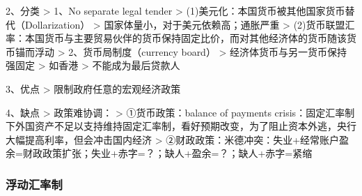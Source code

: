 \documentclass[12pt]{book}
\begin{document}
2、分类
> 1、No separate legal tender  
> (1)美元化：本国货币被其他国家货币替代（Dollarization）  
> 国家体量小，对于美元依赖高；通胀严重  
> (2)货币联盟汇率：本国货币与主要贸易伙伴的货币保持固定比价，而对其他经济体的货币随该货币锚而浮动  
> 2、货币局制度（currency board）  
> 经济体货币与另一货币保持强固定  
> 如香港  
> 不能成为最后贷款人


3、优点
> 限制政府任意的宏观经济政策

4、缺点
> 政策难协调：  
> ①货币政策：balance of payments crisis：固定汇率制下外国资产不足以支持维持固定汇率制，看好预期改变，为了阻止资本外逃，央行大幅提高利率，但会冲击国内经济  
> ②财政政策：米德冲突：失业+经常账户盈余=财政政策扩张；失业+赤字=？；缺人+盈余=？；缺人+赤字=紧缩



\subsubsection{浮动汇率制}
\end{document}
